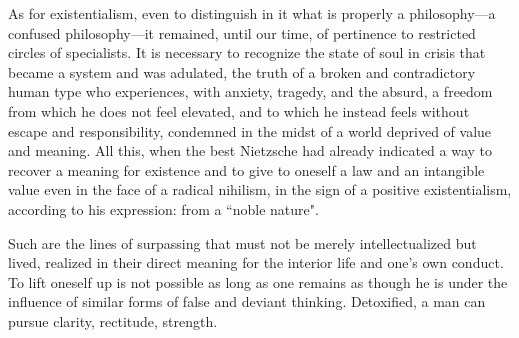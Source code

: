 As for existentialism, even to distinguish in it what is properly a philosophy—a confused philosophy—it remained, until our time, of pertinence to restricted circles of specialists. It is necessary to recognize the state of soul in crisis that became a system and was adulated, the truth of a broken and contradictory human type who experiences, with anxiety, tragedy, and the absurd, a freedom from which he does not feel elevated, and to which he instead feels without escape and responsibility, condemned in the midst of a world deprived of value and meaning. All this, when the best Nietzsche had already indicated a way to recover a meaning for existence and to give to oneself a law and an intangible value even in the face of a radical nihilism, in the sign of a positive existentialism, according to his expression: from a ``noble nature".

Such are the lines of surpassing that must not be merely intellectualized but lived, realized in their direct meaning for the interior life and one's own conduct. To lift oneself up is not possible as long as one remains as though he is under the influence of similar forms of false and deviant thinking. Detoxified, a man can pursue clarity, rectitude, strength.

